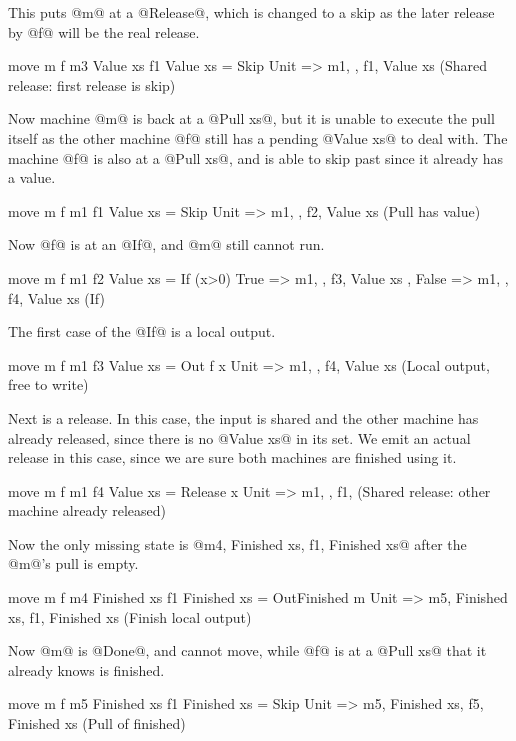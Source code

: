 This puts @m@ at a @Release@, which is changed to a skip as the later release by @f@ will be the real release.

\begin{code}
move m f m3 {Value xs} f1 {Value xs} =
    Skip
    { Unit => m1, {}, f1, {Value xs} }
(Shared release: first release is skip)
\end{code}

Now machine @m@ is back at a @Pull xs@, but it is unable to execute the pull itself as the other machine @f@ still has a pending @Value xs@ to deal with.
The machine @f@ is also at a @Pull xs@, and is able to skip past since it already has a value.

\begin{code}
move m f m1 {} f1 {Value xs} =
    Skip
    { Unit => m1, {}, f2, {Value xs} }
(Pull has value)
\end{code}

Now @f@ is at an @If@, and @m@ still cannot run.

\begin{code}
move m f m1 {} f2 {Value xs} =
    If (x>0)
    { True  => m1, {}, f3, {Value xs}
    , False => m1, {}, f4, {Value xs} }
(If)
\end{code}

The first case of the @If@ is a local output. 
\begin{code}
move m f m1 {} f3 {Value xs} =
    Out f x
    { Unit => m1, {}, f4, {Value xs} }
(Local output, free to write)
\end{code}

Next is a release.
In this case, the input is shared and the other machine has already released, since there is no @Value xs@ in its set.
We emit an actual release in this case, since we are sure both machines are finished using it.

\begin{code}
move m f m1 {} f4 {Value xs} =
    Release x
    { Unit => m1, {}, f1, {} }
(Shared release: other machine already released)
\end{code}

Now the only missing state is @m4, {Finished xs}, f1, {Finished xs}@ after the @m@'s pull is empty.

\begin{code}
move m f m4 {Finished xs} f1 {Finished xs} =
    OutFinished m
    { Unit => m5, {Finished xs}, f1, {Finished xs} }
(Finish local output)
\end{code}

Now @m@ is @Done@, and cannot move, while @f@ is at a @Pull xs@ that it already knows is finished.
\begin{code}
move m f m5 {Finished xs} f1 {Finished xs} =
    Skip
    { Unit => m5, {Finished xs}, f5, {Finished xs} }
(Pull of finished)
\end{code}

